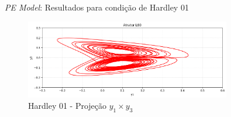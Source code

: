 
\begin{frame}{\textit{PE Model}: Resultados para condição de Hardley 01}
   \begin{figure}
       \centering
       \includegraphics[width=0.8\textwidth]{img/p02y1y3.png}
       \caption{Hardley 01 - Projeção $y_1 \times y_3$}
       \label{fig:p02y1y3}
   \end{figure}
\end{frame}


